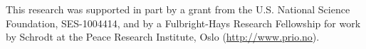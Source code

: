 \documentclass[graybox]{svmult}
\begin{document}


\begin{acknowledgement}
This research was supported in part by a grant from the U.S. National Science Foundation, SES-1004414, and by a Fulbright-Hays Research Fellowship for work by Schrodt at the Peace Research Institute, Oslo (\url{http://www.prio.no}).
\end{acknowledgement}




%
\end{document}
